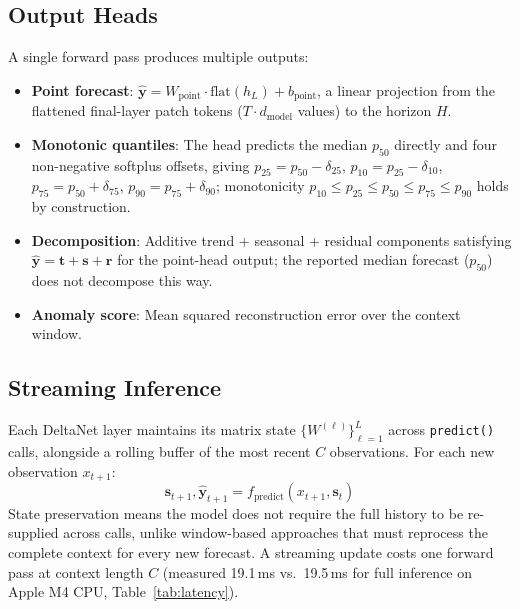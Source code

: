 \documentclass[11pt]{article}
\begin{document}
\subsection{Output Heads}
\label{sec:heads}

A single forward pass produces multiple outputs:

\begin{itemize}
\item \textbf{Point forecast}: $\hat{\mathbf{y}} = W_{\text{point}} \cdot \text{flat}(h_L) + b_{\text{point}}$, a linear projection from the flattened final-layer patch tokens ($T \cdot d_{\text{model}}$ values) to the horizon $H$.
\item \textbf{Monotonic quantiles}: The head predicts the median $p_{50}$ directly and four non-negative softplus offsets, giving $p_{25} = p_{50} - \delta_{25}$, $p_{10} = p_{25} - \delta_{10}$, $p_{75} = p_{50} + \delta_{75}$, $p_{90} = p_{75} + \delta_{90}$; monotonicity $p_{10} \leq p_{25} \leq p_{50} \leq p_{75} \leq p_{90}$ holds by construction.
\item \textbf{Decomposition}: Additive trend + seasonal + residual components satisfying $\hat{\mathbf{y}} = \mathbf{t} + \mathbf{s} + \mathbf{r}$ for the point-head output; the reported median forecast ($p_{50}$) does not decompose this way.
\item \textbf{Anomaly score}: Mean squared reconstruction error over the context window.
\end{itemize}

\subsection{Streaming Inference}
\label{sec:streaming}

Each DeltaNet layer maintains its matrix state $\{W^{(\ell)}\}_{\ell=1}^{L}$ across \texttt{predict()} calls, alongside a rolling buffer of the most recent $C$ observations. For each new observation $x_{t+1}$:
\begin{equation}
\mathbf{s}_{t+1}, \hat{\mathbf{y}}_{t+1} = f_{\text{predict}}(x_{t+1}, \mathbf{s}_t)
\label{eq:streaming}
\end{equation}
State preservation means the model does not require the full history to be re-supplied across calls, unlike window-based approaches that must reprocess the complete context for every new forecast. A streaming update costs one forward pass at context length $C$ (measured 19.1\,ms vs.\ 19.5\,ms for full inference on Apple M4 CPU, Table~\ref{tab:latency}).
\end{document}
